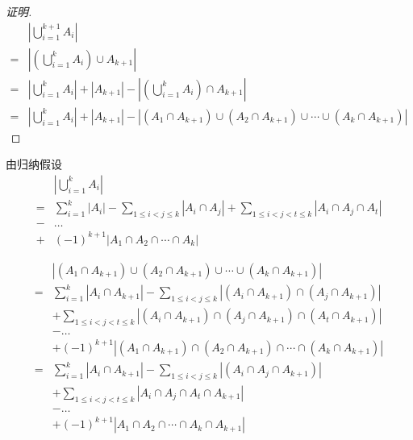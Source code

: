 \documentclass{beamer}
\begin{document}
\begin{CJK*}{UTF8}{gbsn}
\begin{frame}
\begin{proof}[证明]
  \begin{equation}\label{eq1}
    \begin{split}
      &|\bigcup_{i=1}^{k+1}A_i|\\
      =&|(\bigcup_{i=1}^kA_i) \cup A_{k+1}|\\
      =&|\bigcup_{i=1}^kA_i| + |A_{k+1}| - |(\bigcup_{i=1}^kA_i) \cap A_{k+1}|\\
      =&|\bigcup_{i=1}^kA_i| + |A_{k+1}| - |(A_1 \cap A_{k+1}) \cup (A_2 \cap A_{k+1}) \cup \cdots \cup (A_k \cap A_{k+1})|
    \end{split}
  \end{equation}
\end{proof}
\end{frame}
\begin{frame}
由归纳假设
  \begin{equation}\label{eq2}
\begin{split}
    &|\bigcup_{i=1}^kA_i|\\
=&\sum_{i=1}^k|A_i| - \sum_{1\leq i < j \leq k}|A_i \cap A_j| + \sum_{1 \leq  i < j < t \leq k}|A_i \cap A_j \cap A_t|\\
-&\ldots\\
+&(-1)^{k+1}|A_1 \cap A_2 \cap \cdots \cap A_k| 
  \end{split}
\end{equation}
\end{frame}
\begin{frame}
  \begin{equation}\label{eq3}
    \begin{split}
      &|(A_1 \cap A_{k+1}) \cup (A_2 \cap A_{k+1}) \cup \cdots \cup (A_k \cap A_{k+1})|\\
      =&\sum_{i=1}^k|A_i \cap A_{k+1}| - \sum_{1\leq i < j \leq k}|(A_i \cap A_{k+1}) \cap (A_j \cap A_{k+1}) |\\
      &+ \sum_{1 \leq  i < j < t \leq k}|(A_i \cap A_{k+1}) \cap (A_j \cap A_{k+1}) \cap (A_t \cap A_{k+1})|\\
&-\ldots\\
&+(-1)^{k+1}|(A_1 \cap A_{k+1}) \cap (A_2 \cap A_{k+1}) \cap \cdots \cap (A_k \cap A_{k+1})| \\
      =&\sum_{i=1}^k|A_i \cap A_{k+1}| - \sum_{1\leq i < j \leq k}|(A_i  \cap A_j \cap A_{k+1}) |\\
      &+ \sum_{1 \leq  i < j < t \leq k}|A_i  \cap A_j  \cap A_t \cap A_{k+1}|\\
&-\ldots\\
&+(-1)^{k+1}|A_1  \cap A_2  \cap \cdots \cap A_k \cap A_{k+1}| \\

\end{split}
\end{equation}
\end{frame}
\end{CJK*}
\end{document}
